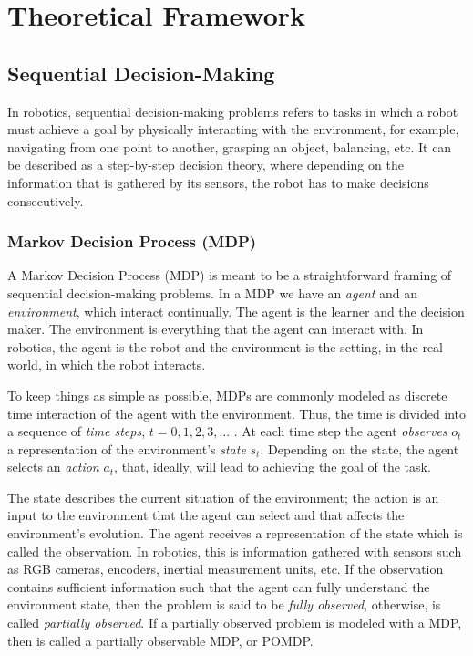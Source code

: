 \chapter{Theoretical Framework}
\section{Sequential Decision-Making}
In robotics, sequential decision-making problems refers to tasks in which a robot must achieve a goal by physically interacting with the environment, for example, navigating from one point to another, grasping an object, balancing, etc. It can be described as a step-by-step decision theory, where depending on the information that is gathered by its sensors, the robot has to make decisions consecutively.

\subsection{Markov Decision Process (MDP)}
A Markov Decision Process (MDP) is meant to be a straightforward framing of sequential decision-making problems. In a MDP we have an \emph{agent} and an \emph{environment}, which interact continually. The agent is the learner and the decision maker. The environment is everything that the agent can interact with\cite{sutton}. In robotics, the agent is the robot and the environment is the setting, in the real world, in which the robot interacts.

To keep things as simple as possible, MDPs are commonly modeled as discrete time interaction of the agent with the environment. Thus, the time is divided into a sequence of \emph{time steps}, $t=0,1,2,3,...$ . At each time step the agent \emph{observes} $o_{t}$ a representation of the environment's \emph{state} $s_{t}$. Depending on the state, the agent selects an \emph{action} $a_{t}$, that, ideally, will lead to achieving the goal of the task.

The state describes the current situation of the environment; the action is an input to the environment that the agent can select and that affects the environment's evolution. The agent receives a representation of the state which is called the observation. In robotics, this is information gathered with sensors such as RGB cameras, encoders, inertial measurement units, etc. If the observation contains sufficient information such that the agent can fully understand the environment state, then the problem is said to be \emph{fully observed}, otherwise, is called \emph{partially observed}. If a partially observed problem is modeled with a MDP, then is called a partially observable MDP, or POMDP.

